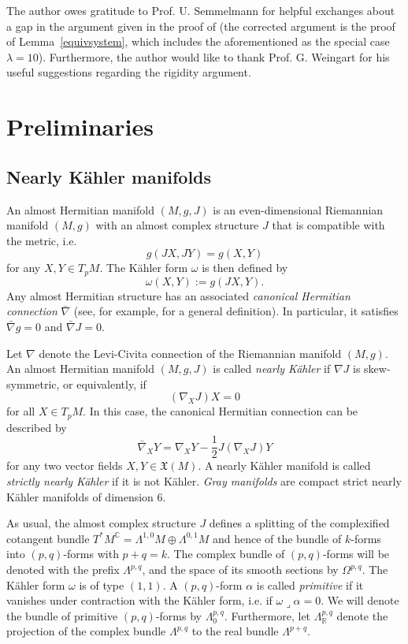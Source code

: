 \documentclass[12pt]{scrartcl}
\theoremstyle{plain}
\theoremstyle{definition}
\newcommand{\R}{\mathbb{R}}%
\newcommand{\C}{\mathbb{C}}%
\newcommand{\X}{\mathfrak{X}}%
\begin{document}
The author owes gratitude to Prof. U. Semmelmann for helpful exchanges about a gap in the argument given in the proof of \cite[Thm.~5.1]{nearlykaehler} (the corrected argument is the proof of Lemma~\ref{equivsystem}, which includes the aforementioned as the special case $\lambda=10$). Furthermore, the author would like to thank Prof. G. Weingart for his useful suggestions regarding the rigidity argument.

\section{Preliminaries}
\label{sec:prelim}

\subsection{Nearly Kähler manifolds}
\label{sec:prelimnk}

An almost Hermitian manifold $(M,g,J)$ is an even-dimensional Riemannian manifold $(M,g)$ with an almost complex structure $J$ that is compatible with the metric, i.e.
\[g(JX,JY)=g(X,Y)\]
for any $X,Y\in T_pM$. The Kähler form $\omega$ is then defined by
\[\omega(X,Y):=g(JX,Y).\]
Any almost Hermitian structure has an associated \emph{canonical Hermitian connection} $\bar\nabla$ (see, for example, \cite[Sec.~2]{3sym} for a general definition). In particular, it satisfies $\bar\nabla g=0$ and $\bar\nabla J=0$.

Let $\nabla$ denote the Levi-Civita connection of the Riemannian manifold $(M,g)$. An almost Hermitian manifold $(M,g,J)$ is called \emph{nearly Kähler} if $\nabla J$ is skew-symmetric, or equivalently, if
\[(\nabla_XJ)X=0\]
for all $X\in T_pM$. In this case, the canonical Hermitian connection can be described by
\[\bar\nabla_XY=\nabla_XY-\frac{1}{2}J(\nabla_XJ)Y\]
for any two vector fields $X,Y\in\X(M)$. A nearly Kähler manifold is called \emph{strictly nearly Kähler} if it is not Kähler. \emph{Gray manifolds} are compact strict nearly Kähler manifolds of dimension $6$.

As usual, the almost complex structure $J$ defines a splitting of the complexified cotangent bundle $T^\ast M^\C=\Lambda^{1,0}M\oplus\Lambda^{0,1}M$ and hence of the bundle of $k$-forms into $(p,q)$-forms with $p+q=k$. The complex bundle of $(p,q)$-forms will be denoted with the prefix $\Lambda^{p,q}$, and the space of its smooth sections by $\Omega^{p,q}$. The Kähler form $\omega$ is of type $(1,1)$. A $(p,q)$-form $\alpha$ is called \emph{primitive} if it vanishes under contraction with the Kähler form, i.e. if $\omega\lrcorner\alpha=0$. We will denote the bundle of primitive $(p,q)$-forms by $\Lambda^{p,q}_0$. Furthermore, let $\Lambda^{p,q}_\R$ denote the projection of the complex bundle $\Lambda^{p,q}$ to the real bundle $\Lambda^{p+q}$.
\end{document}
